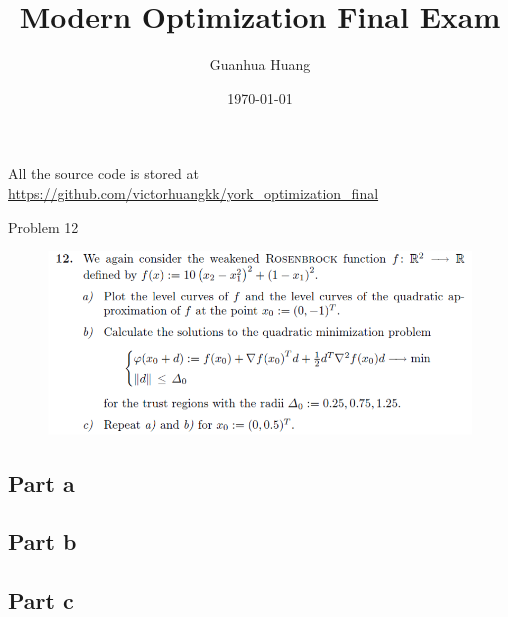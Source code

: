 \documentclass[12pt]{article}
\title{Modern Optimization Final Exam}
\author{Guanhua Huang}
\date\today
\begin{document}
\maketitle %
All the source code is stored at \url{https://github.com/victorhuangkk/york_optimization_final}

\begin{section}{Problem 12}
	\begin{figure}[htp]
		\centering
		\includegraphics[width=12cm]{problem12.png}
	\end{figure}
\subsection{Part a}
\subsection{Part b}
\subsection{Part c}
\end{section}
\end{document}
